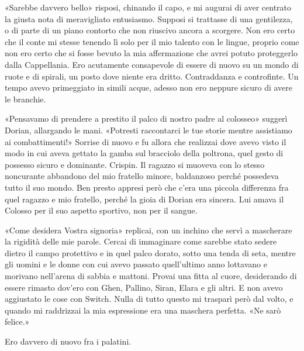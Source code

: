 «Sarebbe davvero bello» risposi, chinando il capo, e mi augurai di aver
centrato la giusta nota di meravigliato entusiasmo. Supposi si trattasse
di una gentilezza, o di parte di un piano contorto che non riuscivo
ancora a scorgere. Non ero certo che il conte mi stesse tenendo lì solo
per il mio talento con le lingue, proprio come non ero certo che si
fosse bevuto la mia affermazione che avrei potuto proteggerlo dalla
Cappellania. Ero acutamente consapevole di essere di nuovo su un mondo
di ruote e di spirali, un posto dove niente era dritto. Contraddanza e
controfinte. Un tempo avevo primeggiato in simili acque, adesso non ero
neppure sicuro di avere le branchie.

«Pensavamo di prendere a prestito il palco di nostro padre al colosseo»
suggerì Dorian, allargando le mani. «Potresti raccontarci le tue storie
mentre assistiamo ai combattimenti!» Sorrise di nuovo e fu allora che
realizzai dove avevo visto il modo in cui aveva gettato la gamba sul
bracciolo della poltrona, quel gesto di possesso sicuro e dominante.
Crispin. Il ragazzo si muoveva con lo stesso noncurante abbandono del
mio fratello minore, baldanzoso perché possedeva tutto il suo mondo. Ben
presto appresi però che c'era una piccola differenza fra quel ragazzo e
mio fratello, perché la gioia di Dorian era sincera. Lui amava il
Colosso per il suo aspetto sportivo, non per il sangue.

«Come desidera Vostra signoria» replicai, con un inchino che servì a
mascherare la rigidità delle mie parole. Cercai di immaginare come
sarebbe stato sedere dietro il campo protettivo e in quel palco dorato,
sotto una tenda di seta, mentre gli uomini e le donne con cui avevo
passato quell'ultimo anno lottavano e morivano nell'arena di sabbia e
mattoni. Provai una fitta al cuore, desiderando di essere rimasto
dov'ero con Ghen, Pallino, Siran, Elara e gli altri. E non avevo
aggiustato le cose con Switch. Nulla di tutto questo mi trasparì però
dal volto, e quando mi raddrizzai la mia espressione era una maschera
perfetta. «Ne sarò felice.»

Ero davvero di nuovo fra i palatini.


